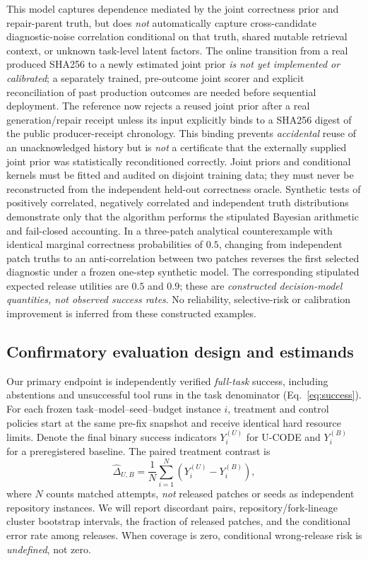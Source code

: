\documentclass[pdflatex,sn-basic]{sn-jnl}
\begin{document}
This model captures dependence mediated by the joint
correctness prior and repair-parent truth, but does
\emph{not} automatically capture cross-candidate
diagnostic-noise correlation conditional on that truth,
shared mutable retrieval context, or unknown task-level
latent factors. The online transition from a real
produced SHA256 to a newly estimated joint prior
\emph{is not yet implemented or calibrated}; a
separately trained, pre-outcome joint scorer and
explicit reconciliation of past production outcomes
are needed before sequential deployment. The reference
now rejects a reused joint prior after a real
generation/repair receipt unless its input explicitly
binds to a SHA256 digest of the public producer-receipt
chronology. This binding prevents \emph{accidental}
reuse of an unacknowledged history but is \emph{not}
a certificate that the externally supplied joint
prior was statistically reconditioned correctly. Joint priors
and conditional kernels must be fitted and audited on
disjoint training data; they must never be reconstructed
from the independent held-out correctness oracle.
Synthetic tests of positively correlated, negatively
correlated and independent truth distributions demonstrate
only that the algorithm performs the stipulated
Bayesian arithmetic and fail-closed accounting. In a
three-patch analytical counterexample with identical
marginal correctness probabilities of $0.5$, changing
from independent patch truths to an anti-correlation
between two patches reverses the first selected
diagnostic under a frozen one-step synthetic model.
The corresponding stipulated expected release utilities
are $0.5$ and $0.9$; these are \emph{constructed
decision-model quantities, not observed success rates}.
No reliability, selective-risk or calibration improvement
is inferred from these constructed examples.

\subsection{Confirmatory evaluation design and estimands}

Our primary endpoint is independently verified \emph{full-task}
success, including abstentions and unsuccessful tool runs in the
task denominator (Eq.~\eqref{eq:success}). For each frozen
task--model--seed--budget instance $i$, treatment and control policies
start at the same pre-fix snapshot and receive identical hard
resource limits. Denote the final binary success indicators
$Y_i^{(U)}$ for U-CODE and $Y_i^{(B)}$ for a preregistered
baseline. The paired treatment contrast is
\begin{equation}
 \widehat{\Delta}_{U,B}
 =\frac{1}{N}\sum_{i=1}^N
 \left(Y_i^{(U)}-Y_i^{(B)}\right),
 \label{eq:paired}
\end{equation}
where $N$ counts matched attempts, \emph{not} released patches
or seeds as independent repository instances. We will report
discordant pairs, repository/fork-lineage cluster bootstrap intervals,
the fraction of released patches, and the conditional error rate
among releases. When coverage is zero, conditional wrong-release
risk is \emph{undefined}, not zero.
\end{document}
